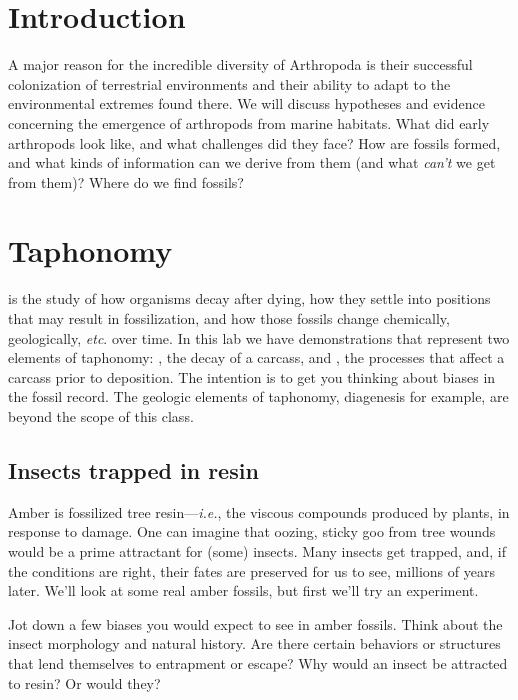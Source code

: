 \section{Introduction}
A major reason for the incredible diversity of Arthropoda is their successful colonization of terrestrial environments and their ability to adapt to the environmental extremes found there. We will discuss hypotheses and evidence concerning the emergence of arthropods from marine habitats. What did early arthropods look like, and what challenges did they face? How are fossils formed, and what kinds of information can we derive from them (and what \textit{can't} we get from them)? Where do we find fossils? 

\section{Taphonomy}
 is the study of how organisms decay after dying, how they settle into positions that may result in fossilization, and how those fossils change chemically, geologically, \textit{etc}. over time. In this lab we have demonstrations that represent two elements of taphonomy: , the decay of a carcass, and , the processes that affect a carcass prior to deposition. The intention is to get you thinking about biases in the fossil record. The geologic elements of taphonomy, diagenesis for example, are beyond the scope of this class.

\subsection{Insects trapped in resin}
Amber is fossilized tree resin---\textit{i.e.}, the viscous compounds produced by plants, in response to damage. One can imagine that oozing, sticky goo from tree wounds would be a prime attractant for (some) insects. Many insects get trapped, and, if the conditions are right, their fates are preserved for us to see, millions of years later. We'll look at some real amber fossils, but first we'll try an experiment.

\begin{theo}
{}Jot down a few biases you would expect to see in amber fossils. Think about the insect morphology and natural history. Are there certain behaviors or structures that lend themselves to entrapment or escape? Why would an insect be attracted to resin? Or would they?\end{theo}\vspace{3mm}

